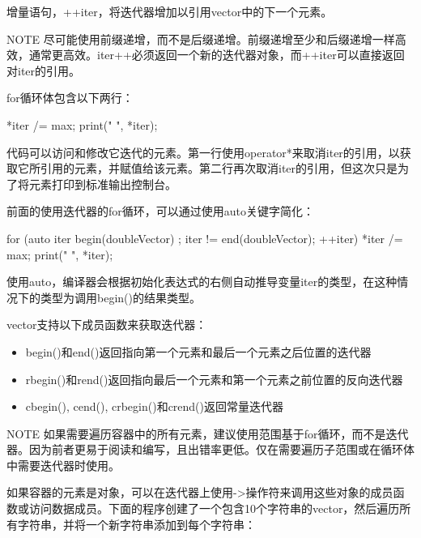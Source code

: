 增量语句，++iter，将迭代器增加以引用vector中的下一个元素。

\begin{myNotic}{NOTE}
尽可能使用前缀递增，而不是后缀递增。前缀递增至少和后缀递增一样高效，通常更高效。iter++必须返回一个新的迭代器对象，而++iter可以直接返回对iter的引用。
\end{myNotic}

for循环体包含以下两行：

\begin{cpp}
*iter /= max;
print("{} ", *iter);
\end{cpp}

代码可以访问和修改它迭代的元素。第一行使用operator*来取消iter的引用，以获取它所引用的元素，并赋值给该元素。第二行再次取消iter的引用，但这次只是为了将元素打印到标准输出控制台。

前面的使用迭代器的for循环，可以通过使用auto关键字简化：

\begin{cpp}
for (auto iter { begin(doubleVector) };
    iter != end(doubleVector); ++iter) {
    *iter /= max;
    print("{} ", *iter);
}
\end{cpp}

使用auto，编译器会根据初始化表达式的右侧自动推导变量iter的类型，在这种情况下的类型为调用begin()的结果类型。

vector支持以下成员函数来获取迭代器：

\begin{itemize}
\item
begin()和end()返回指向第一个元素和最后一个元素之后位置的迭代器

\item
rbegin()和rend()返回指向最后一个元素和第一个元素之前位置的反向迭代器

\item
cbegin(), cend(), crbegin()和crend()返回常量迭代器
\end{itemize}

\begin{myNotic}{NOTE}
如果需要遍历容器中的所有元素，建议使用范围基于for循环，而不是迭代器。因为前者更易于阅读和编写，且出错率更低。仅在需要遍历子范围或在循环体中需要迭代器时使用。
\end{myNotic}


如果容器的元素是对象，可以在迭代器上使用->操作符来调用这些对象的成员函数或访问数据成员。下面的程序创建了一个包含10个字符串的vector，然后遍历所有字符串，并将一个新字符串添加到每个字符串：

